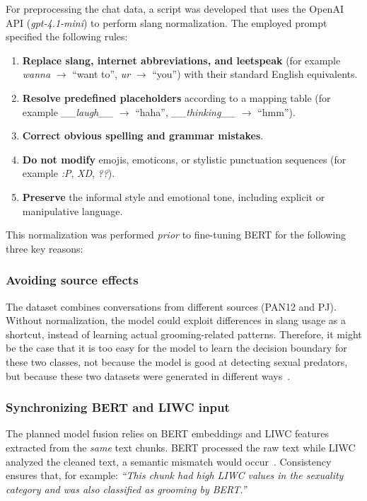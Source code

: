 For preprocessing the chat data, a script was developed that uses the OpenAI API (\textit{gpt-4.1-mini}) to perform slang normalization. The employed prompt specified the following rules:
\begin{enumerate}
    \item \textbf{Replace slang, internet abbreviations, and leetspeak} (for example \textit{wanna} $\rightarrow$ ``want to'', \textit{ur} $\rightarrow$ ``you'') with their standard English equivalents.
    \item \textbf{Resolve predefined placeholders} according to a mapping table (for example \textit{\_\_laugh\_\_} $\rightarrow$ ``haha'', \textit{\_\_thinking\_\_} $\rightarrow$ ``hmm'').
    \item \textbf{Correct obvious spelling and grammar mistakes}.
    \item \textbf{Do not modify} emojis, emoticons, or stylistic punctuation sequences (for example \textit{:P}, \textit{XD}, \textit{??}).
    \item \textbf{Preserve} the informal style and emotional tone, including explicit or manipulative language.
\end{enumerate}

This normalization was performed \emph{prior} to fine-tuning BERT for the following three key reasons:

\subsubsection{Avoiding source effects}  
The dataset combines conversations from different sources (PAN12 and PJ). Without normalization, the model could exploit differences in slang usage as a shortcut, instead of learning actual grooming-related patterns. Therefore, it might be the case that it is too easy for the model to learn the decision boundary for these two classes, not because the model is good at detecting sexual predators, but because these two datasets were generated in different ways~\cite{schlaepfer2022online}.

\subsubsection{Synchronizing BERT and LIWC input}  
The planned model fusion relies on BERT embeddings and LIWC features extracted from the \emph{same} text chunks. BERT processed the raw text while LIWC analyzed the cleaned text, a semantic mismatch would occur~\cite{he2021deberta}. Consistency ensures that, for example:  
\textit{``This chunk had high LIWC values in the sexuality category and was also classified as grooming by BERT.''}
 
